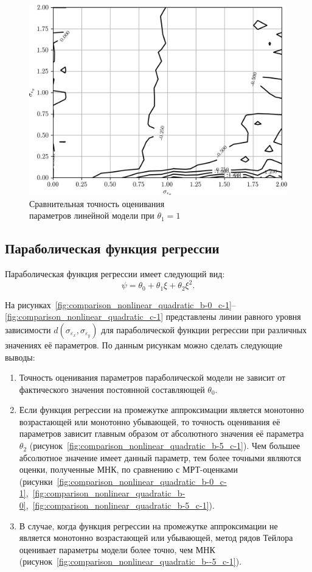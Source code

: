 \begin{figure}[b]
  \centering
  \includegraphics[width=135mm]{fig/nonlinear/linear/a-0_b-1.png}
  \caption{
    Сравнительная точность оценивания \\
    параметров линейной модели при \( \theta_1 = 1 \)
  }\label{fig:comparison_nonlinear_linear}
\end{figure}

\vspace{2\baselineskip}
\subsection{Параболическая функция регрессии}

Параболическая функция регрессии имеет следующий вид:
\[ \psi = \theta_0 + \theta_1 \xi + \theta_2 \xi^2. \]

На рисунках~\ref{fig:comparison_nonlinear_quadratic_b-0_c-1}--\ref{fig:comparison_nonlinear_quadratic_c-1} представлены линии равного уровня зависимости
\( d(\sigma_{\varepsilon_x}, \sigma_{\varepsilon_y}) \)
для параболической функции регрессии при различных значениях её параметров.
По данным рисункам можно сделать следующие выводы:
\begin{enumerate}
\item Точность оценивания параметров параболической модели не зависит
  от фактического значения постоянной составляющей \( \theta_0 \).
\item Если функция регрессии на промежутке аппроксимации является монотонно
  возрастающей или монотонно убывающей,
  то точность оценивания её параметров зависит главным образом от
  абсолютного значения её параметра \( \theta_2 \)
  (рисунок~\ref{fig:comparison_nonlinear_quadratic_b-5_c-1}).
  Чем большее абсолютное значение имеет данный параметр,
  тем более точными являются оценки, полученные МНК,
  по сравнению с МРТ-оценками
  (рисунки~\ref{fig:comparison_nonlinear_quadratic_b-0_c-1},~\ref{fig:comparison_nonlinear_quadratic_b-0},~\ref{fig:comparison_nonlinear_quadratic_b-5_c-1}).
\item В случае, когда функция регрессии на промежутке аппроксимации не является
  монотонно возрастающей или убывающей,
  метод рядов Тейлора оценивает параметры модели более точно, чем МНК
  (рисунок~\ref{fig:comparison_nonlinear_quadratic_b--5_c-1}).
\end{enumerate}

